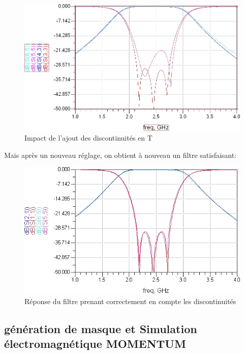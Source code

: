 \documentclass[10pt]{article}
\begin{document}
\begin{figure}
    \begin{center}
        \includegraphics[width=15cm]{p22_Simu_sans_tune}
    \end{center}
    \caption{Impact de l’ajout des discontinuités en T}
\end{figure}

Mais après un nouveau réglage, on obtient à nouveau un filtre satisfaisant:

\begin{figure}
    \begin{center}
        \includegraphics[width=15cm]{p22_Simu_avec_tune}
    \end{center}
    \caption{Réponse du filtre prenant correctement en compte les discontinuités}
\end{figure}

\subsection{génération de masque et Simulation électromagnétique MOMENTUM}
\end{document}
